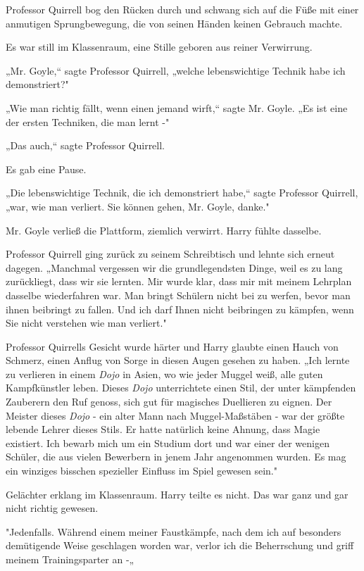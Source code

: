 {Professor Quirrell bog den Rücken durch und schwang sich auf die Füße mit einer anmutigen Sprungbewegung, die von seinen Händen keinen Gebrauch machte.

Es war still im Klassenraum, eine Stille geboren aus reiner Verwirrung.

„Mr. Goyle,“ sagte Professor Quirrell, „welche lebenswichtige Technik habe ich demonstriert?"

„Wie man richtig fällt, wenn einen jemand wirft,“ sagte Mr. Goyle. „Es ist eine der ersten Techniken, die man lernt -"

„Das auch,“ sagte Professor Quirrell.

Es gab eine Pause.

„Die lebenswichtige Technik, die ich demonstriert habe,“ sagte Professor Quirrell, „war, wie man verliert. Sie können gehen, Mr. Goyle, danke."

Mr. Goyle verließ die Plattform, ziemlich verwirrt. Harry fühlte dasselbe.

Professor Quirrell ging zurück zu seinem Schreibtisch und lehnte sich erneut dagegen. „Manchmal vergessen wir die grundlegendsten Dinge, weil es zu lang zurückliegt, dass wir sie lernten. Mir wurde klar, dass mir mit meinem Lehrplan dasselbe wiederfahren war. Man bringt Schülern nicht bei zu werfen, bevor man ihnen beibringt zu fallen. Und ich darf Ihnen nicht beibringen zu kämpfen, wenn Sie nicht verstehen wie man verliert."

Professor Quirrells Gesicht wurde härter und Harry glaubte einen Hauch von Schmerz, einen Anflug von Sorge in diesen Augen gesehen zu haben. „Ich lernte zu verlieren in einem \emph{Dojo} in Asien, wo wie jeder Muggel weiß, alle guten Kampfkünstler leben. Dieses \emph{Dojo} unterrichtete einen Stil, der unter kämpfenden Zauberern den Ruf genoss, sich gut für magisches Duellieren zu eignen. Der Meister dieses \emph{Dojo} - ein alter Mann nach Muggel-Maßstäben - war der größte lebende Lehrer dieses Stils. Er hatte natürlich keine Ahnung, dass Magie existiert. Ich bewarb mich um ein Studium dort und war einer der wenigen Schüler, die aus vielen Bewerbern in jenem Jahr angenommen wurden. Es mag ein winziges bisschen spezieller Einfluss im Spiel gewesen sein."

Gelächter erklang im Klassenraum. Harry teilte es nicht. Das war ganz und gar nicht richtig gewesen.

"Jedenfalls. Während einem meiner Faustkämpfe, nach dem ich auf besonders demütigende Weise geschlagen worden war, verlor ich die Beherrschung und griff meinem Trainingsparter an -„

}
